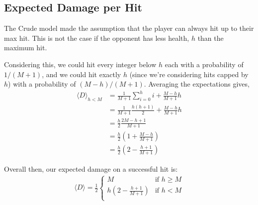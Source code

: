 		\subsection{Expected Damage per Hit}
			The Crude model made the assumption that the player can always hit up to their max hit. This is not the case if the opponent has less health, $h$ than the maximum hit.
			\begin{center}
			\end{center}
			Considering this, we could hit every integer below $h$ each with a probability of $1/(M+1)$, and we could hit exactly $h$ (since we're considering hits capped by $h$) with a probability of $(M-h)/(M+1)$. Averaging the expectations gives,
			\begin{align}
				\langle D \rangle_{h < M} &= \frac{1}{M+1}\sum_{i=0}^{h} i + \frac{M-h}{M+1}h \\
				&= \frac{1}{M+1}\frac{h(h+1)}{2} + \frac{M-h}{M+1}h \\
				&= \frac{h}{2}\frac{2M-h+1}{M+1}\\
				&= \frac{h}{2}\left(1 + \frac{M - h}{M+1}\right)\\
				&= \frac{h}{2}\left(2 - \frac{h + 1}{M+1}\right)
			\end{align}

			Overall then, our expected damage on a successful hit is:
			\begin{align}
				\boxed{
					\langle D \rangle = \frac{1}{2}\begin{cases}
						M &\text{if $h \ge M$} \\
						h\left(2 - \frac{h + 1}{M+1}\right) &\text{if $h < M$} \\
					\end{cases}
				}
			\end{align}

